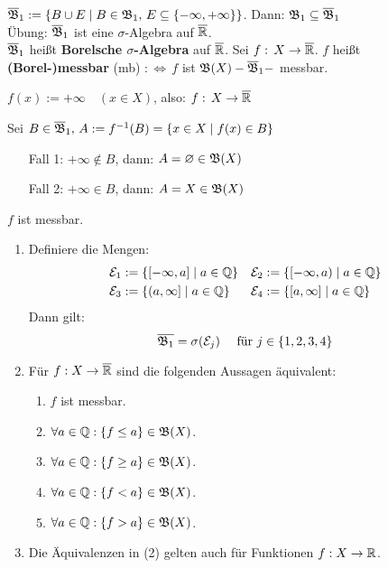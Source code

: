 \documentclass[a4paper,twoside,DIV15,BCOR12mm,chapterprefix=true,headings=onelinechapter]{scrbook}
\begin{document}
\begin{definition}
\(\overline{\mathfrak{B}}_{1}:=\{B\cup E\mid B\in\mathfrak{B}_{1},\,E\subseteq\{-\infty,+\infty\}\}\). Dann: \(\mathfrak{B}_{1}\subseteq\overline{\mathfrak{B}}_{1}\)\\
Übung: \(\overline{\mathfrak{B}}_{1}\) ist eine \(\sigma\)-Algebra auf \(\overline{\mathbb{R}}\).\\
\(\overline{\mathfrak{B}}_{1}\) hei\ss t \textbf{Borelsche \(\sigma\)-Algebra} auf \(\overline{\mathbb{R}}\).
Sei \(f:\,X\to\overline{\mathbb{R}}\). \(f\) hei\ss t \textbf{(Borel-)messbar} (mb) \(:\Leftrightarrow\,f\) ist \(\mathfrak{B}(X)-\overline{\mathfrak{B}}_{1}-\) messbar.
\end{definition}

\begin{beispiel}
\(f(x):=+\infty\quad(x\in X)\), also: \(f:\,X\to\overline{\mathbb{R}}\)

Sei \(B\in\overline{\mathfrak{B}}_{1},\,A:=f^{-1}(B)=\{x\in X\mid f(x)\in B\}\)
\begin{itemize}
\item[Fall 1:] \(+\infty\not\in B\), dann: \(A=\varnothing\in\mathfrak{B}(X)\)
\item[Fall 2:] \(+\infty\in B\), dann: \(A=X\in\mathfrak{B}(X)\)
\end{itemize}
\(f\) ist messbar.
\end{beispiel}

\begin{satz}
\label{Satz 3.4}
\begin{enumerate}
\item Definiere die Mengen:
\begin{align*}
\mathcal{E}_1&:=\{[-\infty,a]\mid a\in\mathbb{Q}\} & \mathcal{E}_2&:=\{[-\infty,a)\mid a\in\mathbb{Q}\}\\
\mathcal{E}_3&:=\{(a,\infty]\mid a\in\mathbb{Q}\} & \mathcal{E}_4&:=\{[a,\infty]\mid a\in\mathbb{Q}\}
\end{align*}
Dann gilt:
\[\overline{\mathfrak{B}_1}=\sigma(\mathcal{E}_j)\quad \text{ für }j\in\{1,2,3,4\}\]
\item Für $f:X\to\overline{\mathbb{R}}$ sind die folgenden Aussagen äquivalent:
\begin{enumerate}
\item $f$ ist messbar.
\item $\forall a\in\mathbb{Q}: \{f\le a\}\in\mathfrak{B}(X)$.
\item $\forall a\in\mathbb{Q}: \{f\ge a\}\in\mathfrak{B}(X)$.
\item $\forall a\in\mathbb{Q}: \{f< a\}\in\mathfrak{B}(X)$.
\item $\forall a\in\mathbb{Q}: \{f> a\}\in\mathfrak{B}(X)$.
\end{enumerate}
\item Die Äquivalenzen in (2) gelten auch für Funktionen $f:X\to\mathbb{R}$.
\end{enumerate}
\end{satz}
\end{document}
